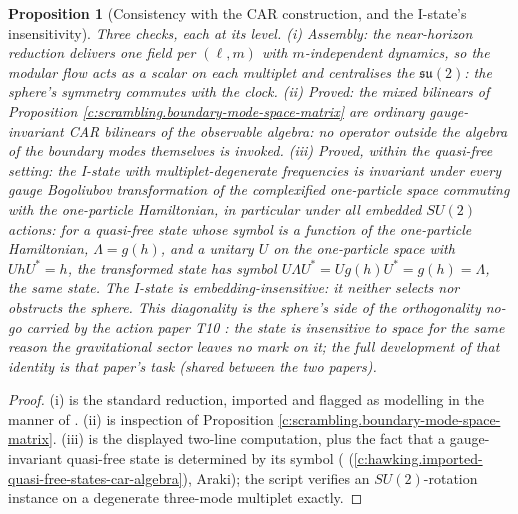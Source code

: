 \documentclass[11pt]{article}
\newtheorem{proposition}[theorem]{Proposition}
\theoremstyle{definition}
\theoremstyle{plain}
\begin{document}
\begin{proposition}[Consistency with the CAR construction, and the I-state's insensitivity]\label{c:scrambling.consistency-car-construction-i-states-insensitivity}
Three checks, each at its level. (i) \emph{Assembly:} the near-horizon reduction delivers one field per $(\ell, m)$ with $m$-independent dynamics, so the modular flow acts as a scalar on each multiplet and centralises the $\mathfrak{su}(2)$: the sphere's symmetry commutes with the clock. (ii) \emph{Proved:} the mixed bilinears of Proposition \ref{c:scrambling.boundary-mode-space-matrix} are ordinary gauge-invariant CAR bilinears of the observable algebra: no operator outside the algebra of the boundary modes themselves is invoked. (iii) \emph{Proved, within the quasi-free setting:} the I-state with multiplet-degenerate frequencies is invariant under every gauge Bogoliubov transformation of the complexified one-particle space commuting with the one-particle Hamiltonian, in particular under all embedded $SU(2)$ actions: for a quasi-free state whose symbol is a function of the one-particle Hamiltonian, $\Lambda = g(h)$, and a unitary $U$ on the one-particle space with $UhU^* = h$, the transformed state has symbol $U\Lambda U^* = Ug(h)U^* = g(h) = \Lambda$, the same state. The I-state is embedding-insensitive: it neither selects nor obstructs the sphere. This diagonality is the sphere's side of the orthogonality no-go carried by the action paper T10 \cite{ButlerT10}: the state is insensitive to space for the same reason the gravitational sector leaves no mark on it; the full development of that identity is that paper's task (shared between the two papers).
\end{proposition}
\begin{proof}
(i) is the standard reduction, imported and flagged as modelling in the manner of \cite[Rem.~4.5]{ButlerT7}. (ii) is inspection of Proposition \ref{c:scrambling.boundary-mode-space-matrix}. (iii) is the displayed two-line computation, plus the fact that a gauge-invariant quasi-free state is determined by its symbol (\cite[Fact 3.3]{ButlerT7} (\ref{c:hawking.imported-quasi-free-states-car-algebra}), Araki); the script verifies an $SU(2)$-rotation instance on a degenerate three-mode multiplet exactly.

\end{proof}
\end{document}

